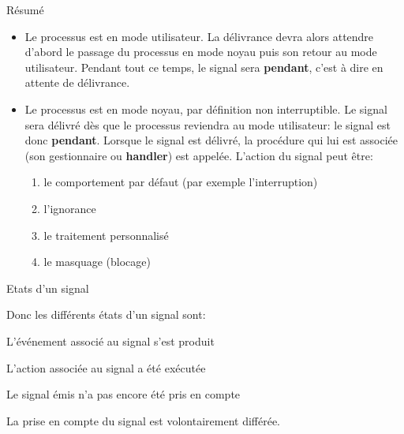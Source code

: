 \documentclass[9pt]{beamer}
\begin{document}
\begin{frame}{Résumé}
\begin{itemize}
    \item<+->
    Le processus est en mode utilisateur. La délivrance devra alors
    attendre d'abord le passage du processus en mode noyau  puis son
    retour au mode utilisateur. Pendant tout ce temps, le signal sera
    \textbf{pendant}, c'est à dire en attente de délivrance.
    \item<+->
Le processus est en mode noyau, par définition non interruptible. Le
signal sera délivré dès que le processus reviendra au mode
utilisateur: le signal est donc \textbf{pendant}. Lorsque le signal est délivré, la procédure qui lui
est associée (son gestionnaire ou\textbf{ handler})  est appelée. L'action du signal peut être:
\begin{enumerate}
    \item  le comportement par défaut (par exemple l'interruption)
    \item l'ignorance
    \item le traitement personnalisé
    \item le masquage (blocage)
\end{enumerate}
\end{itemize}
\end{frame}
\begin{frame}{Etats d'un signal}
\begin{definition}
    Donc les différents états d'un signal sont:
    \begin{description}[<+->]
        \item[généré/émis:] L’événement associé au signal s’est produit
        \item[délivré:] L’action associée au signal a été exécutée
        \item[pendant:]  Le signal émis n'a pas encore été pris en compte
        \item[bloqué/masqué:] La prise en compte du signal est volontairement différée.
    \end{description}
\end{definition}
\end{frame}
\end{document}

